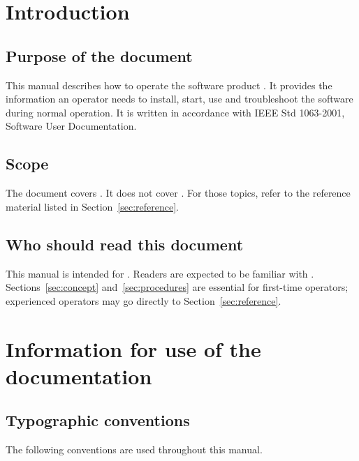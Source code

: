 \documentclass[12pt,a4paper]{extarticle}
\begin{document}
\section{Introduction}

\subsection{Purpose of the document}
This manual describes how to operate the software product \hseProjectNameEn. It provides the information an operator needs to install, start, use and troubleshoot the software during normal operation. It is written in accordance with IEEE Std 1063-2001, Software User Documentation.

\subsection{Scope}
The document covers . It does not cover . For those topics, refer to the reference material listed in Section~\ref{sec:reference}.

\subsection{Who should read this document}
This manual is intended for . Readers are expected to be familiar with . Sections~\ref{sec:concept} and~\ref{sec:procedures} are essential for first-time operators; experienced operators may go directly to Section~\ref{sec:reference}.

\section{Information for use of the documentation}

\subsection{Typographic conventions}
The following conventions are used throughout this manual.
\end{document}
